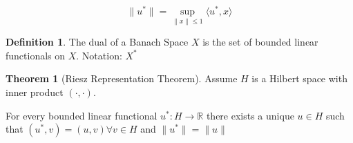 \documentclass{article}
\theoremstyle{definition}
\newtheorem{definition}{Definition}
\newtheorem{theorem}{Theorem}
\begin{document}
\[
    \lVert u^{\ast} \rVert = \sup _{\lVert x \rVert \leq 1} \langle u^{\ast} , x \rangle 
\]

\begin{definition}
    The dual of a Banach Space \(X\) is the set of bounded linear functionals on \(X\). Notation: \(X^{\ast}\) 
\end{definition}

\begin{theorem}
    [Riesz Representation Theorem] Assume \(H\) is a Hilbert space with inner product \((\cdot,\cdot)\). 

    For every bounded linear functional \(u^{\ast} : H \to \mathbb{R}\) there exists a unique \(u\in H\) such that \((u^{\ast} , v) = (u,v) \forall v\in H\) and \(\lVert u^{\ast} \rVert = \lVert u \rVert\) 
\end{theorem}
\end{document}
